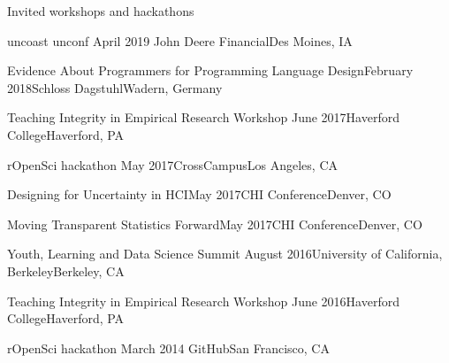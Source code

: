 \documentclass{resume} %
\begin{document}
\begin{rSection}{Invited workshops and hackathons}

\begin{sSubsection}{uncoast unconf}{ }{April 2019}{ John Deere Financial}{Des Moines, IA}
\end{sSubsection}

\begin{sSubsection}{Evidence About Programmers for Programming Language Design}{}{February 2018}{Schloss Dagstuhl}{Wadern, Germany}
\end{sSubsection}

\begin{sSubsection}{Teaching Integrity in Empirical Research Workshop}{ }{June 2017}{Haverford College}{Haverford, PA}
\end{sSubsection}

\begin{sSubsection}{rOpenSci hackathon}{ }{May 2017}{CrossCampus}{Los Angeles, CA}
\end{sSubsection}

\begin{sSubsection}{Designing for Uncertainty in HCI}{}{May 2017}{CHI Conference}{Denver, CO}
\end{sSubsection}

\begin{sSubsection}{Moving Transparent Statistics Forward}{}{May 2017}{CHI Conference}{Denver, CO}
\end{sSubsection}

\begin{sSubsection}{Youth, Learning and Data Science Summit}{ }{August 2016}{University of California, Berkeley}{Berkeley, CA}
\end{sSubsection}

\begin{sSubsection}{Teaching Integrity in Empirical Research Workshop}{ }{June 2016}{Haverford College}{Haverford, PA}
\end{sSubsection}

\begin{sSubsection}{rOpenSci hackathon}{ }{March 2014}{ GitHub}{San Francisco, CA}
\end{sSubsection}


\end{rSection}

\end{document}
